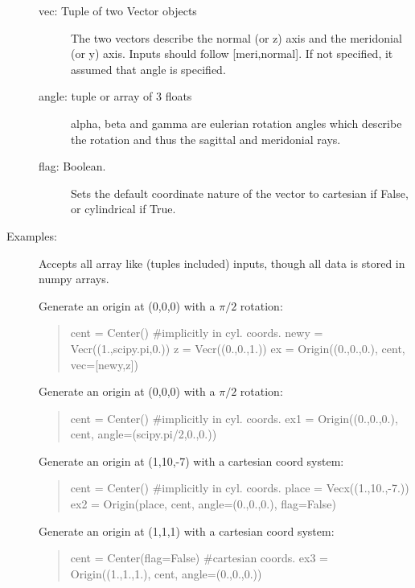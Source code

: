 \documentclass[letterpaper,10pt,english]{sphinxmanual}
\begin{document}
\begin{fulllineitems}
\begin{description}
\begin{description}
\item[{vec: Tuple of two Vector objects}] \leavevmode
The two vectors describe the normal (or z) axis and
the meridonial (or y) axis. Inputs should follow
{[}meri,normal{]}. If not specified, it assumed that angle
is specified.

\item[{angle: tuple or array of 3 floats}] \leavevmode
alpha, beta and gamma are eulerian rotation angles which
describe the rotation and thus the sagittal and 
meridonial rays.

\item[{flag: Boolean.}] \leavevmode
Sets the default coordinate nature of the vector to 
cartesian if False, or cylindrical if True.

\end{description}

\item[{Examples:   }] \leavevmode
Accepts all array like (tuples included) inputs, though all data 
is stored in numpy arrays.

Generate an origin at (0,0,0) with a $\pi/2$ rotation:
\begin{quote}

cent = Center() \#implicitly in cyl. coords.
newy = Vecr((1.,scipy.pi,0.))
z = Vecr((0.,0.,1.))
ex = Origin((0.,0.,0.), cent, vec={[}newy,z{]})
\end{quote}

Generate an origin at (0,0,0) with a $\pi/2$ rotation:
\begin{quote}

cent = Center() \#implicitly in cyl. coords.
ex1 = Origin((0.,0.,0.), cent, angle=(scipy.pi/2,0.,0.))
\end{quote}

Generate an origin at (1,10,-7) with a cartesian coord system:
\begin{quote}

cent = Center() \#implicitly in cyl. coords.
place = Vecx((1.,10.,-7.))
ex2 = Origin(place, cent, angle=(0.,0.,0.), flag=False)
\end{quote}

Generate an origin at (1,1,1) with a cartesian coord system:
\begin{quote}

cent = Center(flag=False) \#cartesian coords.
ex3 = Origin((1.,1.,1.), cent, angle=(0.,0.,0.))
\end{quote}

\end{description}


\end{fulllineitems}
\end{document}
